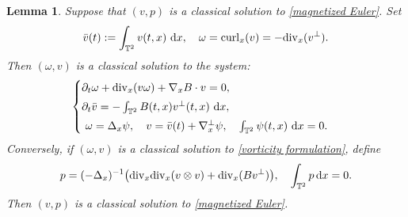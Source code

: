 \documentclass[11pt,reqno]{amsart}
\newtheorem{lem}[thm]{Lemma}
\numberwithin{equation}{section}
\def\dd{{\rm d}}
\begin{document}
\begin{lem}\label{lemma3.2}
Suppose that $(v,p)$ is a classical solution to  \eqref{magnetized Euler}. 
Set 
\begin{align*}
\bar{v}(t):= \int_{\mathbb{T}^{2}}v(t,x)\ \dd x, \quad 
\omega=\mathrm{curl}_{x}(v)=-\mathrm{div}_{x}(v^{\perp}).  \end{align*} 
Then $(\omega,v)$ is a classical solution to the system{\rm:}
\begin{align}
\begin{cases}
\partial_{t}\omega+\mathrm{div}_{x}(v\omega)+\nabla_{x} B\cdot v = 0, \\[1mm]
\partial_t\bar{v}=-\int_{\mathbb{T}^{2}}B(t,x)v^{\perp}(t,x)\ \dd x,\\[1mm]
\ \omega =\Delta_{x} \psi,\quad v=\bar{v}(t)+\nabla^{\perp}_{x}\psi,
\quad \int_{\mathbb{T}^{2}}\psi(t,x)\ \dd x=0.
\end{cases}  
\label{vorticity formulation lemma}
\end{align}
Conversely, if  $(\omega,v)$ is a classical solution to
\eqref{vorticity formulation},  define 
$$
p=(-\Delta_{x})^{-1}
\big(\mathrm{div}_{x}\mathrm{div}_{x}(v\otimes v)+\mathrm{div}_{x}(Bv^{\perp})\big),
\quad \int_{\mathbb T^2}p\,\dd x=0.
$$ 
Then $(v,p)$ is a classical solution to  \eqref{magnetized Euler}.  \label{vorticity formulation}
\end{lem}
\end{document}
